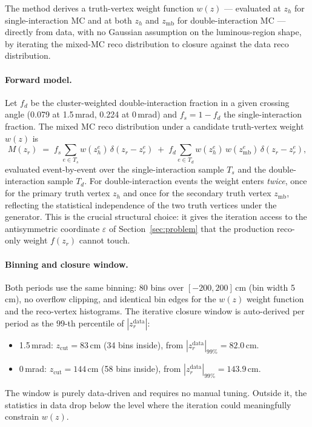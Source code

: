 \documentclass[11pt,a4paper]{article}
\begin{document}
The method derives a truth-vertex weight function $w(z)$ --- evaluated at
$z_h$ for single-interaction MC and at both $z_h$ and $z_\mathrm{mb}$
for double-interaction MC --- directly from data, with no Gaussian
assumption on the luminous-region shape, by iterating the mixed-MC reco
distribution to closure against the data reco distribution.

\paragraph{Forward model.}
Let $f_d$ be the cluster-weighted double-interaction fraction in a given
crossing angle (0.079 at 1.5\,mrad, 0.224 at 0\,mrad) and
$f_s = 1 - f_d$ the single-interaction fraction. The mixed MC reco
distribution under a candidate truth-vertex weight $w(z)$ is
\begin{equation}
M(z_r) \;=\;
f_s \!\!\sum_{e \in T_s}\! w(z_h^{e})\,\delta(z_r - z_r^e)
\;+\;
f_d \!\!\sum_{e \in T_d}\! w(z_h^{e})\,w(z_\mathrm{mb}^{e})\,\delta(z_r - z_r^e),
\label{eq:iter_forward}
\end{equation}
evaluated event-by-event over the single-interaction sample $T_s$ and
the double-interaction sample $T_d$. For double-interaction events the
weight enters \emph{twice}, once for the primary truth vertex $z_h$ and
once for the secondary truth vertex $z_\mathrm{mb}$, reflecting the
statistical independence of the two truth vertices under the generator.
This is the crucial structural choice: it gives the iteration access to
the antisymmetric coordinate $\varepsilon$ of
Section~\ref{sec:problem} that the production reco-only weight $f(z_r)$
cannot touch.

\paragraph{Binning and closure window.}
Both periods use the same binning: $80$ bins over $[-200, 200]$\,cm
(bin width 5\,cm), no overflow clipping, and identical bin edges for the
$w(z)$ weight function and the reco-vertex histograms. The iterative closure window is auto-derived per
period as the $99$-th percentile of $|z_r^\mathrm{data}|$:
\begin{itemize}\setlength\itemsep{1pt}
\item 1.5\,mrad: $z_\mathrm{cut}\!=\!83$\,cm (34 bins inside),
      from $|z_r^\mathrm{data}|_{99\%}\!=\!82.0$\,cm.
\item 0\,mrad:   $z_\mathrm{cut}\!=\!144$\,cm (58 bins inside),
      from $|z_r^\mathrm{data}|_{99\%}\!=\!143.9$\,cm.
\end{itemize}
The window is purely data-driven and requires no manual tuning. Outside
it, the statistics in data drop below the level where the iteration
could meaningfully constrain $w(z)$.
\end{document}
